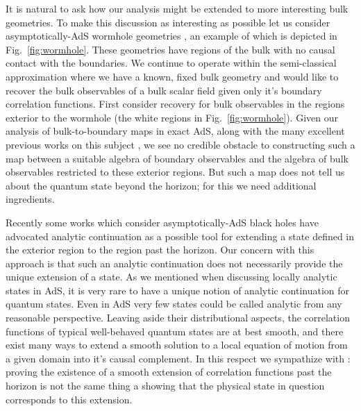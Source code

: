 \documentclass[12pt]{article}
\numberwithin{equation}{section}
\begin{document}
It is natural to ask how our analysis might be extended to more 
interesting bulk geometries. To make this discussion as interesting as
possible let us consider asymptotically-AdS wormhole geometries
\cite{Aminneborg:1997aa,Krasnov:2000zq,Krasnov:2003aa,Skenderis:2009ju,
  Shenker:2013yza},
an example of which is depicted in Fig.~\ref{fig:wormhole}.
These geometries have regions of the bulk with no causal contact
with the boundaries.
We continue to operate within the semi-classical approximation
where we have a known, fixed bulk geometry and would like to
recover the bulk observables of a bulk scalar field given only
it's boundary correlation functions.
First consider recovery for bulk observables in the regions exterior
to the wormhole (the white regions in Fig.~\ref{fig:wormhole}).
Given our analysis of bulk-to-boundary maps in exact AdS, along with
the many excellent previous works on this subject
\cite{Bena:1999jv,Hamilton:2005ju,Hamilton:2006az,Hamilton:2006fh,
  Lowe:2008ra,Kabat:2011rz,Heemskerk:2012mq,Kabat:2012hp,Kabat:2012av},
we see no credible obstacle to constructing such a map between
a suitable algebra of boundary observables and the algebra of 
bulk observables restricted to these exterior regions.
But such a map does not tell us about the quantum state beyond 
the horizon; for this we need additional ingredients.


Recently some works \cite{Papadodimas:2012aq,Verlinde:2013qya}
which consider asymptotically-AdS black holes
have advocated analytic continuation as a possible tool for 
extending a state defined in the exterior
region to the region past the horizon.
Our concern with this approach is that such an analytic continuation
does not necessarily provide the unique extension of a state.
As we mentioned when discussing locally analytic states in AdS,
it is very rare to have a unique notion of analytic continuation for
quantum states.
Even in AdS very few states could be 
called analytic from any reasonable perspective. Leaving aside 
their distributional aspects, the correlation functions
of typical well-behaved quantum states are at best smooth,
and there exist many ways to extend a smooth solution to a local
equation of motion from a given domain into it's causal complement.
In this respect we sympathize with \cite{Avery:2013bea}:
proving the existence of a smooth extension of correlation functions
past the horizon is not the same thing a showing that
the physical state in question corresponds to this extension.
\end{document}
